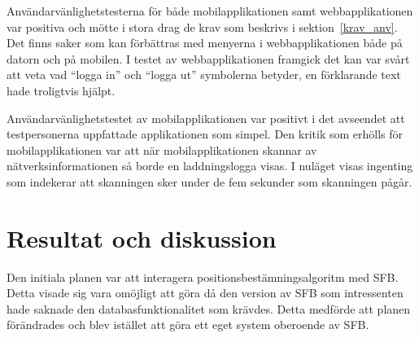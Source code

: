 \documentclass[a4paper,12pt]{article}
\begin{document}
 Användarvänlighetstesterna för både mobilapplikationen samt webbapplikationen var positiva och mötte i stora drag de krav som beskrivs i sektion~\ref{krav_anv}. Det finns saker som kan förbättras med menyerna i webbapplikationen både på datorn och på mobilen. I testet av webbapplikationen framgick det kan var svårt att veta vad ``logga in'' och ``logga ut'' symbolerna betyder, en förklarande text hade troligtvis hjälpt.

 Användarvänlighetstestet av mobilapplikationen var positivt i det avseendet att testpersonerna uppfattade applikationen som simpel. Den kritik som erhölls för mobilapplikationen var att när mobilapplikationen skannar av nätverksinformationen så borde en laddningslogga visas. I nuläget visas ingenting som indekerar att skanningen sker under de fem sekunder som skanningen pågår.


 \section{Resultat och diskussion}\label{resultat}

 Den initiala planen var att interagera positionsbestämningsalgoritm med SFB. Detta visade sig vara omöjligt att göra då den version av SFB som intressenten hade saknade den databasfunktionalitet som krävdes. Detta medförde att planen förändrades och blev istället att göra ett eget system oberoende av SFB.
\end{document}
